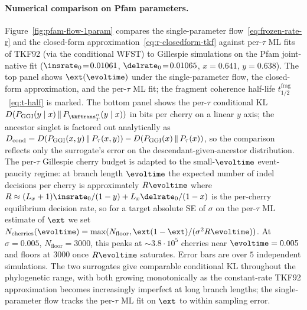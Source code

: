 \paragraph{Numerical comparison on Pfam parameters.}
Figure~\ref{fig:pfam-flow-1param} compares the single-parameter
flow~\eqref{eq:frozen-rate-r} and the closed-form
approximation~\eqref{eq:r-closedform-tkf} against per-$\tau$ ML fits of
TKF92 (via the conditional WFST) to Gillespie simulations on the Pfam
joint-native fit ($\insrate_0\!=\!0.01061$, $\delrate_0\!=\!0.01065$,
$x\!=\!0.641$, $y\!=\!0.638$).  The top panel shows $\fragext(\evoltime)$
under the single-parameter flow, the closed-form approximation, and
the per-$\tau$ ML fit; the fragment coherence half-life
$t_{1/2}^{\mathrm{frag}}$~\eqref{eq:t-half} is marked.  The bottom panel shows the per-$\tau$
conditional KL
$D(P_\ggi(\desc\mid\anc)\,\|\,P_{\tkftrans''_T}(\desc\mid\anc))$ in
bits per cherry on a linear $y$ axis; the ancestor singlet is factored
out analytically as
$D_\mathrm{cond} = D(P_{\mathrm{GGI}}(x,y)\,\|\,P_\tau(x,y)) -
D(P_{\mathrm{GGI}}(x)\,\|\,P_\tau(x))$, so the comparison reflects only the
surrogate's error on the descendant-given-ancestor distribution.  The
per-$\tau$ Gillespie cherry budget is adapted to the small-$\evoltime$
event-paucity regime: at branch length $\evoltime$ the expected number
of indel decisions per cherry is approximately $R\evoltime$ where
$R \approx (L_\anc+1)\insrate_0/(1-y) + L_\anc\delrate_0/(1-x)$ is the
per-cherry equilibrium decision rate, so for a target absolute SE of
$\sigma$ on the per-$\tau$ ML estimate of $\fragext$ we set
$N_\text{cherries}(\evoltime) = \max(N_\text{floor},
\fragext(1-\fragext)/(\sigma^{2}R\evoltime))$.  At $\sigma=0.005$,
$N_\text{floor}=3000$, this peaks at $\sim 3.8\cdot 10^{5}$ cherries
near $\evoltime=0.005$ and floors at $3000$ once $R\evoltime$ saturates.
Error bars are over $5$ independent simulations.  The two surrogates
give comparable conditional KL throughout the phylogenetic range, with
both growing monotonically as the constant-rate TKF92 approximation
becomes increasingly imperfect at long branch lengths; the
single-parameter flow tracks the per-$\tau$ ML fit on $\fragext$ to
within sampling error.


